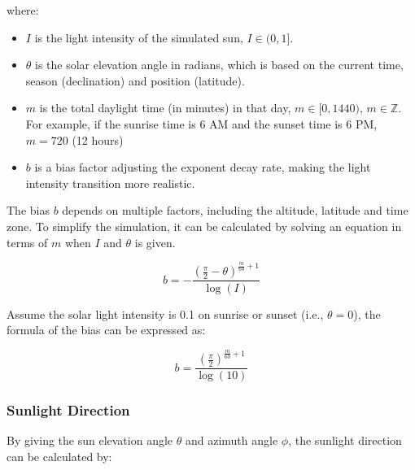 \documentclass{article}
\begin{document}
where:
\begin{itemize}
  \item \( I \) is the light intensity of the simulated sun, \( I \in (0, 1] \).
  \item \( \theta \) is the solar elevation angle in radians, which is based on the current time, 
  season (declination) and position (latitude).
  \item \( m \) is the total daylight time (in minutes) in that day, \( m \in [0, 1440) \), \( m \in \mathbb{Z} \). 
  For example, if the sunrise time is 6 AM and the sunset time is 6 PM, \( m=720 \) (12 hours)
  \item \( b \) is a bias factor adjusting the exponent decay rate, making the light intensity
  transition more realistic.
\end{itemize}

The bias \( b \) depends on multiple factors, including the altitude, latitude and time zone. To
simplify the simulation, it can be calculated by solving an equation in terms of \( m \) when 
\( I \) and \( \theta\) is given.

\[
  b = -\frac{\left(\frac{\pi}{2} - \theta\right)^{\frac{m}{60} + 1}}{\log(I)}
\]

Assume the solar light intensity is 0.1 on sunrise or sunset (i.e., \( \theta=0\)), the formula 
of the bias can be expressed as:

\[
  b = \frac{\left(\frac{\pi}{2}\right)^{\frac{m}{60} + 1}}{\log(10)}
\]


\subsubsection {Sunlight Direction}
By giving the sun elevation angle \( \theta \) and azimuth angle \( \phi \), the sunlight direction
can be calculated by:
\end{document}
